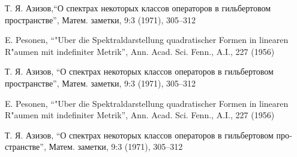 \documentclass{article}
\begin{document}
 
Т. Я. Азизов,“О спектрах некоторых классов операторов в гильбертовом пространстве”, Матем. заметки, 9:3 (1971), 305–312
 
E. Pesonen, “"Uber die Spektraldarstellung quadratischer Formen in linearen R"aumen mit indefiniter Metrik”, Ann. Acad. Sci. Fenn., A.I., 227 (1956) 
 
Т. Я. Азизов, “О спектрах некоторых классов операторов в гильбертовом пространстве”, Матем. заметки, 9:3 (1971), 305–312
 
\foreignlanguage{german}{E. Pesonen, “"Uber die Spektraldarstellung quadratischer Formen in linearen R"aumen mit indefiniter Metrik”, Ann. Acad. Sci. Fenn., A.I., 227 (1956)}
 
\begin{otherlanguage}{russian}
Т. Я. Азизов, “О спектрах некоторых классов операторов в гильбертовом пространстве”, Матем. заметки, 9:3 (1971), 305–312
\end{otherlanguage}
 
  
\end{document}
